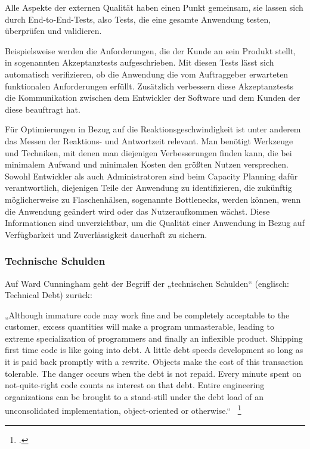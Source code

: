 Alle Aspekte der externen Qualität haben einen Punkt gemeinsam, sie lassen sich durch End-to-End-Tests, also Tests, die eine gesamte Anwendung testen, überprüfen und validieren.

Beispielsweise werden die Anforderungen, die der Kunde an sein Produkt stellt, in sogenannten Akzeptanztests aufgeschrieben. Mit diesen Tests lässt sich automatisch verifizieren, ob die Anwendung die vom Auftraggeber erwarteten funktionalen Anforderungen erfüllt. Zusätzlich verbessern diese Akzeptanztests die Kommunikation zwischen dem Entwickler der Software und dem Kunden der diese beauftragt hat.

Für Optimierungen in Bezug auf die Reaktionsgeschwindigkeit ist unter anderem das Messen der Reaktions- und Antwortzeit relevant. Man benötigt Werkzeuge und Techniken, mit denen man diejenigen 
Verbesserungen finden kann, die bei minimalem Aufwand und minimalen Kosten den größten Nutzen versprechen. Sowohl Entwickler als auch Administratoren sind beim Capacity Planning 
dafür verantwortlich, diejenigen Teile der Anwendung zu identifizieren, die zukünftig möglicherweise zu Flaschenhälsen, sogenannte Bottlenecks, werden können, wenn die Anwendung geändert wird 
oder das Nutzeraufkommen wächst. Diese Informationen sind unverzichtbar, um die Qualität einer Anwendung in Bezug auf Verfügbarkeit und Zuverlässigkeit dauerhaft zu sichern.


\subsubsection{Technische Schulden}
Auf Ward Cunningham geht der Begriff der „technischen Schulden“ (englisch: Technical Debt) zurück:

„Although immature code may work fine and be completely acceptable to the customer,
excess quantities will make a program unmasterable, leading to extreme specialization 
of programmers and finally an inflexible product. Shipping first time code is
like going into debt. A little debt speeds development so long as it is paid back promptly
with a rewrite. Objects make the cost of this transaction tolerable. The danger occurs
when the debt is not repaid. Every minute spent on not-quite-right code counts as interest
on that debt. Entire engineering organizations can be brought to a stand-still 
under the debt load of an unconsolidated implementation, object-oriented or otherwise.“ ~\footcite[Vgl.]{website:ward:cunningham} %

